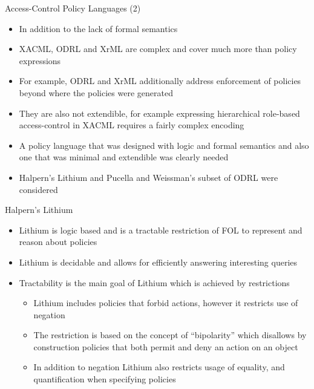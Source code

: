 \documentclass{beamer}
\begin{document}
\begin{frame}{Access-Control Policy Languages (2)}
\begin{itemize}
    \item In addition to the lack of formal semantics
    \item XACML, ODRL and XrML are complex and cover much more than policy expressions     
    \item For example, ODRL and XrML additionally address enforcement of policies beyond where the policies were generated
    \item They are also not extendible, for example expressing hierarchical role-based access-control in XACML requires a fairly complex encoding
    \item A policy language that was designed with logic and formal semantics and also one that was minimal and extendible was clearly needed 
    \item Halpern's Lithium and Pucella and Weissman's subset of ODRL were considered
\end{itemize}
\end{frame}

\begin{frame}{Halpern's Lithium}
\begin{itemize}
    \item Lithium is logic based and is a tractable restriction of FOL to represent and reason about policies
    \item Lithium is decidable and allows for efficiently answering interesting queries
    \item Tractability is the main goal of Lithium which is achieved by restrictions
    \begin{itemize}
      \item Lithium includes policies that forbid actions, however it restricts use of negation
      \item The restriction is based on the concept of ``bipolarity'' which disallows by construction policies that both permit and deny an action on an object
      \item In addition to negation Lithium also restricts usage of equality, and quantification when specifying policies
    \end{itemize}
\end{itemize}
\end{frame}
\end{document}
